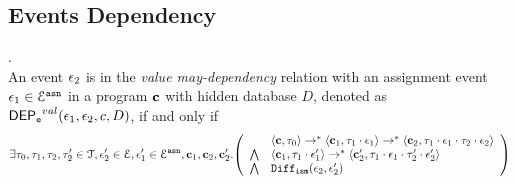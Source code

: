 %
%
%
\subsection{Events Dependency}
%
%
\begin{defn}
\label{def:event_valdep}.
\\
An event $\mathtt{\epsilon}_2$ is in the \emph{value may-dependency} relation with an assignment
event $\mathtt{\epsilon}_1 \in \mathcal{E}^{\mathtt{{asn}}}$ in a program ${\boldsymbol{\mathbf{c}}}$
with hidden database $D$, denoted as 
%
$\mathsf{DEP_{\mathtt{e}}}^{val}(\mathtt{\epsilon}_1, \mathtt{\epsilon}_2, c, D)$, if and only if
%
\[
\exists \vtrace_0,
\vtrace_1, \vtrace_2, \vtrace_2' \in \mathcal{T}, \event_2' \in \eventset, \event_1' \in \eventset^{\asn}, \ssa{c}_1, \ssa{c}_2,  \ssa{c}_2'.
  \left(
  \begin{array}{ll}   
 & \config{\ssa{c}, \vtrace_0} \rightarrow^{*} 
\config{\ssa{c}_1, \vtrace_1 \cdot \event_1}  \rightarrow^{*} 
  \config{\ssa{c}_2,  \vtrace_1 \cdot \event_1 \cdot \vtrace_2 \cdot \event_2 } 
 \\ 
 \bigwedge &
  \config{\ssa{c}_1, \vtrace_1 \cdot \event_1'}  \rightarrow^{*} 
  \config{\ssa{c}_2',  \vtrace_1 \cdot \event_1  \cdot \vtrace_2' \cdot \event_2' } 
\\
\bigwedge & \ismdiff(\event_2,\event_2')
\end{array}
\right)
 \]
%
\end{defn}
%
